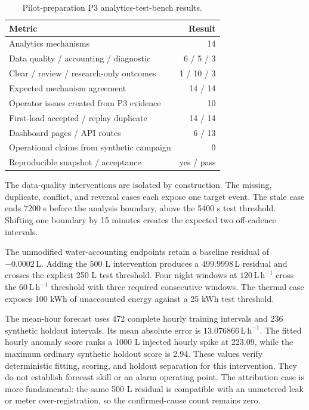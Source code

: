 \documentclass[11pt,a4paper]{article}
\begin{document}
\begin{table}[htbp]
  \centering
  \caption{Pilot-preparation P3 analytics-test-bench results.}
  \label{tab:p3-results}
  \begin{tabular}{lr}
    \toprule
    Metric & Result \\
    \midrule
    Analytics mechanisms & 14 \\
    Data quality / accounting / diagnostic & 6 / 5 / 3 \\
    Clear / review / research-only outcomes & 1 / 10 / 3 \\
    Expected mechanism agreement & 14 / 14 \\
    Operator issues created from P3 evidence & 10 \\
    First-load accepted / replay duplicate & 14 / 14 \\
    Dashboard pages / API routes & 6 / 13 \\
    Operational claims from synthetic campaign & 0 \\
    Reproducible snapshot / acceptance & yes / pass \\
    \bottomrule
  \end{tabular}
\end{table}

The data-quality interventions are isolated by construction. The missing,
duplicate, conflict, and reversal cases each expose one target event. The stale
case ends 7200 s before the analysis boundary, above the 5400 s test threshold.
Shifting one boundary by 15 minutes creates the expected two off-cadence
intervals.

The unmodified water-accounting endpoints retain a baseline residual of
$-0.0002\,\mathrm{L}$. Adding the 500 L intervention produces a
$499.9998\,\mathrm{L}$ residual and crosses the explicit 250 L test threshold.
Four night windows at $120\,\mathrm{L\,h^{-1}}$ cross the
$60\,\mathrm{L\,h^{-1}}$ threshold with three required consecutive windows.
The thermal case exposes 100 kWh of unaccounted energy against a 25 kWh test
threshold.

The mean-hour forecast uses 472 complete hourly training intervals and 236
synthetic holdout intervals. Its mean absolute error is
$13.076866\,\mathrm{L\,h^{-1}}$. The fitted hourly anomaly score ranks a 1000 L
injected hourly spike at 223.09, while the maximum ordinary synthetic holdout
score is 2.94. These values verify deterministic fitting, scoring, and holdout
separation for this intervention. They do not establish forecast skill or an
alarm operating point. The attribution case is more fundamental: the same
500 L residual is compatible with an unmetered leak or meter over-registration,
so the confirmed-cause count remains zero.
\end{document}
